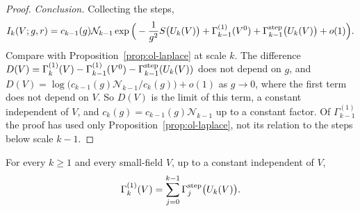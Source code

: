 \begin{proof}
\emph{Conclusion.} Collecting the steps,
\[
I_k(V;g,r)=c_{k-1}(g)\mathcal N_{k-1}\exp\Big(-\frac1{g^2}S\big(U_k(V)\big)+\Gamma^{(1)}_{k-1}(V^0)+\Gamma^{\rm step}_{k-1}\big(U_k(V)\big)+o(1)\Big).
\]
Compare with Proposition~\ref{prop:ol-laplace} at scale $k$. The difference $D(V)=\Gamma^{(1)}_k(V)-\Gamma^{(1)}_{k-1}(V^0)-\Gamma^{\rm step}_{k-1}(U_k(V))$ does not depend on $g$, and $D(V)=\log\big(c_{k-1}(g)\mathcal N_{k-1}/c_k(g)\big)+o(1)$ as $g\to0$, where the first term does not depend on $V$. So $D(V)$ is the limit of this term, a constant independent of $V$, and $c_k(g)=c_{k-1}(g)\mathcal N_{k-1}$ up to a constant factor. Of $\Gamma^{(1)}_{k-1}$ the proof has used only Proposition~\ref{prop:ol-laplace}, not its relation to the steps below scale $k-1$.
\end{proof}

\begin{proposition}\label{prop:ol-composition}
For every $k\ge1$ and every small-field $V$, up to a constant independent of $V$,
\[
\Gamma^{(1)}_k(V)=\sum_{j=0}^{k-1}\Gamma^{\rm step}_j\big(U_k(V)\big).
\]
\end{proposition}

